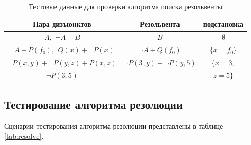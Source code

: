 
\begin{table}[h!]
    \centering
    \caption{Тестовые данные для проверки алгоритма поиска резольвенты}
    \label{tab:resolve1}
    \begin{tabular}{|c|c|c|}
        \hline
        Пара дизъюнктов & Резольвента & подстановка \\
        \hline
        \hline
        $A,~~\neg A + B$ & $B$ & $\emptyset$ \\
        \hline
        $\neg A + P(f_0),~~Q(x) + \neg P(x)$ & $\neg A + Q(f_0)$ & $\{x=f_0\}$ \\
        \hline
        $\neg P(x, y) + \neg P(y, z) + P(x, z)$ & $\neg P(3, y) + \neg P(y, 5)$ & $\{x=3,$ \\
        $\neg P(3, 5)$ & & $z=5\}$ \\
        \hline
    \end{tabular}
\end{table}

\subsection{Тестирование алгоритма резолюции}

Сценарии тестирования алгоритма резолюции представлены в таблице \ref{tab:resolve}.

